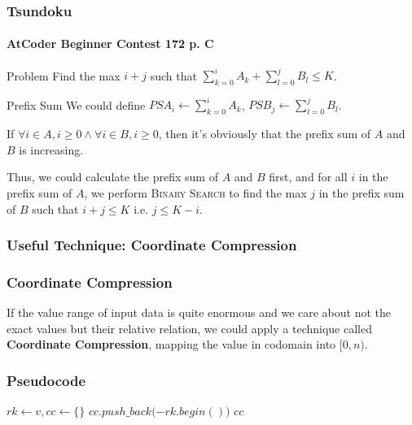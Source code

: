 \documentclass{beamer}
\begin{document}
\frame
{
	\frametitle{Tsundoku}
	\framesubtitle{AtCoder Beginner Contest 172 p. C}
	
	\begin{block}{Problem}
		Find the max $i+j$ such that $\sum_{k=0}^iA_k + \sum_{l=0}^jB_l \leq K$.
	\end{block}
	
	\pause
	
	\begin{block}{Prefix Sum}
		We could define $PSA_i\gets\sum_{k=0}^iA_k$, $PSB_j\gets\sum_{l=0}^jB_l$.\pause
		
		If $\forall i\in A, i\geq 0\land\forall i\in B, i\geq 0$, then it's obviously that the prefix sum of $A$ and $B$ is increasing.\pause
	\end{block}
	
	Thus, we could calculate the prefix sum of $A$ and $B$ first, and for all $i$ in the prefix sum of $A$, we perform \textsc{Binary Search} to find the max $j$ in the prefix sum of $B$ such that $i+j\leq K$ i.e. $j\leq K-i$.
}

\subsubsection{Useful Technique: Coordinate Compression}

\frame
{
	\frametitle{Coordinate Compression}
	
	If the value range of input data is quite enormous and we care about not the exact values but their relative relation, we could apply a technique called \textbf{Coordinate Compression}, mapping the value in codomain into $[0, n)$.
}

\frame
{
	\frametitle{Pseudocode}
	
	\begin{algorithmic}
		\small
    		\State$rk\gets v, cc\gets \{\}$
			\State{}
			\State{}
				\State$cc.push\_back($$ - rk.begin())$
			\EndFor
			\State\Return$cc$
        \EndProcedure
	\end{algorithmic}
}

\end{document}
